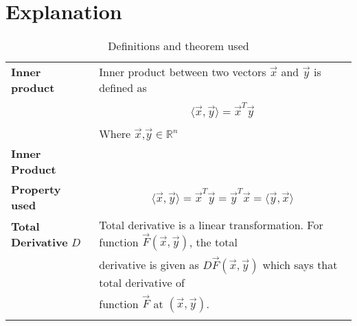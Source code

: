 \documentclass[journal,12pt]{IEEEtran}
\begin{document}
\section{\textbf{Explanation}}
\renewcommand{\thetable}{1}
\begin{longtable}{|l|l|}
\hline
\endhead
\textbf{Inner product}&Inner product between two vectors $\vec{x}$ and $\vec{y}$ is defined as\\&\parbox{13cm}{\begin{align}
    \langle\vec{x},\vec{y}\rangle=\vec{x}^T\vec{y}\label{inp}
\end{align}}\\&Where $\vec{x}$,$\vec{y}\in\mathbb{R}^n$\\
\hline
\textbf{Inner Product}&\\\textbf{Property used}&\parbox{13cm}{\begin{align}
    \langle\vec{x},\vec{y}\rangle=\vec{x}^T\vec{y}=\vec{y}^T\vec{x}=\langle\vec{y},\vec{x}\rangle\label{prop1}
    \end{align}}\\
\hline
\textbf{Total Derivative} $D$&Total derivative is a linear transformation. For function $\vec{F}(\vec{x},\vec{y})$, the total\\& derivative is given as $D\vec{F}(\vec{x},\vec{y})$ which says that total derivative of\\&function $\vec{F}$ at $(\vec{x},\vec{y})$.\\
\hline
\caption{Definitions and theorem used}
\label{deftab}
\end{longtable}
\end{document}
